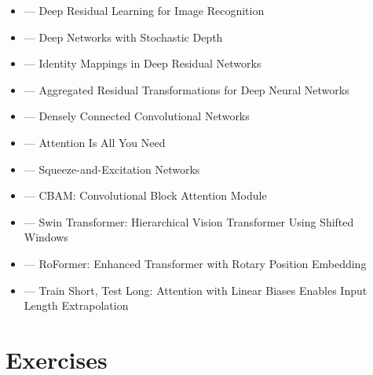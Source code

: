 \begin{itemize}
    \item \cite{he2016deep} --- Deep Residual Learning for Image Recognition
    \item \cite{huang2016deep} --- Deep Networks with Stochastic Depth
    \item \cite{he2016identity} --- Identity Mappings in Deep Residual Networks
    \item \cite{xie2017aggregated} --- Aggregated Residual Transformations for Deep Neural Networks
    \item \cite{huang2017densely} --- Densely Connected Convolutional Networks
    \item \cite{vaswani2017attention} --- Attention Is All You Need
    \item \cite{hu2018squeeze} --- Squeeze-and-Excitation Networks
    \item \cite{woo2018cbam} --- CBAM: Convolutional Block Attention Module
    \item \cite{liu2021swin} --- Swin Transformer: Hierarchical Vision Transformer Using Shifted Windows
    \item \cite{su2021roformer} --- RoFormer: Enhanced Transformer with Rotary Position Embedding
    \item \cite{press2022train} --- Train Short, Test Long: Attention with Linear Biases Enables Input Length Extrapolation
\end{itemize}

\section{Exercises}

